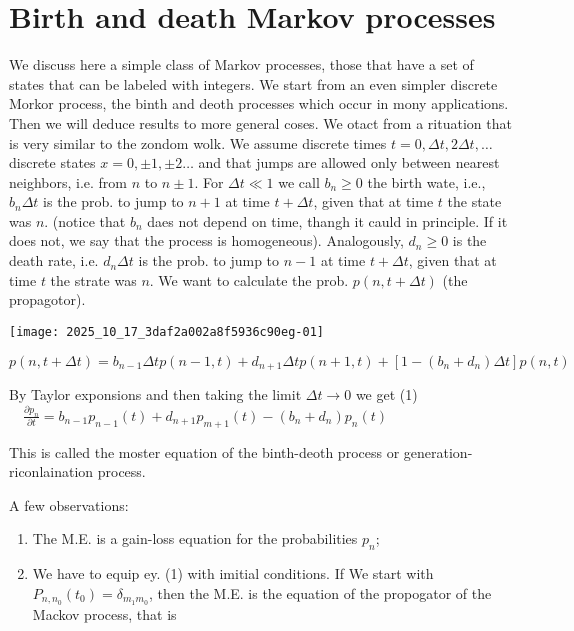 \section{Birth and death Markov processes}
We discuss here a simple class of Markov processes, those that have a set of states that can be labeled with integers. We start from an even simpler discrete Morkor process, the binth and deoth processes which occur in mony applications. Then we will deduce results to more general coses.
We otact from a rituation that is very similar to the zondom wolk. We assume discrete times $t=0, \Delta t, 2 \Delta t, \ldots$ discrete states $x=0, \pm 1, \pm 2 \ldots$ and that jumps are allowed only between nearest neighbors, i.e. from $n$ to $n \pm 1$. For $\Delta t \ll 1$ we call $b_{n} \geqslant 0$ the birth wate, i.e., $b_{n} \Delta t$ is the prob. to jump to $n+1$ at time $t+\Delta t$, given that at time $t$ the state was $n$. (notice that $b_{n}$ daes not depend on time, thangh it cauld in principle. If it does not, we say that the process is homogeneous). Analogously, $d_{n} \geqslant 0$ is the death rate, i.e. $d_{n} \Delta t$ is the prob. to jump to $n-1$ at time $t+\Delta t$, given that at time $t$ the strate was $n$.
We want to calculate the prob. $p(n, t+\Delta t)$ (the propagotor).
\begin{center}
\texttt{[image: 2025\_10\_17\_3daf2a002a8f5936c90eg-01]}
\end{center}


\begin{equation*}
p(n, t+\Delta t)=b_{n-1} \Delta t p(n-1, t)+d_{n+1} \Delta t p(n+1, t)+\left[1-\left(b_{n}+d_{n}\right) \Delta t\right] p(n, t) \tag{1}
\end{equation*}


By Taylor exponsions and then taking the limit $\Delta t \rightarrow 0$ we get
(1) $\quad \frac{\partial p_{n}}{\partial t}=b_{n-1} p_{n-1}(t)+d_{n+1} p_{m+1}(t)-\left(b_{n}+d_{n}\right) p_{n}(t)$

This is called the moster equation of the binth-deoth process or generation-riconlaination process.

A few observations:

\begin{enumerate}
  \item The M.E. is a gain-loss equation for the probabilities $p_{n}$;
  \item We have to equip ey. (1) with imitial conditions. If We start with $P_{n, n_{0}}\left(t_{0}\right)=\delta_{m_{1} m_{0}}$, then the M.E. is the equation of the propogator of the Mackov process, that is
\end{enumerate}

